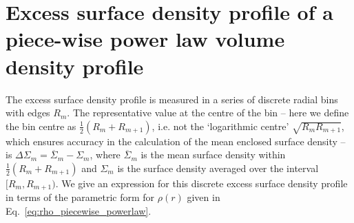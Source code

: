 \documentclass[usenatbib]{mnras}
\begin{document}








\appendix
\onecolumn
\section{Excess surface density profile of a piece-wise power law volume density profile}
\label{sec:appendix_invert_esd}

\noindent The excess surface density profile is measured in a series of discrete radial bins with edges $R_m$. The representative value at the centre of the bin -- here we define the bin centre as $\frac{1}{2}(R_m+R_{m+1})$, i.e. not the `logarithmic centre' $\sqrt{R_mR_{m+1}}$, which ensures accuracy in the calculation of the mean enclosed surface density -- is $\Delta\Sigma_m=\overline{\Sigma}_m-\Sigma_m$, where $\overline{\Sigma}_m$ is the mean surface density within $\frac{1}{2}(R_m+R_{m+1})$ and $\Sigma_m$ is the surface density averaged over the interval $[R_m,R_{m+1})$. We give an expression for this discrete excess surface density profile in terms of the parametric form for $\rho(r)$ given in Eq.~\ref{eq:rho_piecewise_powerlaw}.
\end{document}
